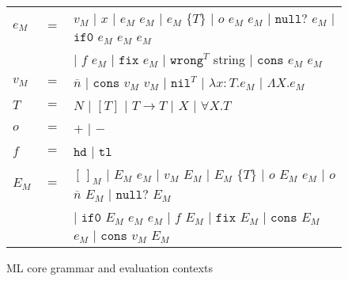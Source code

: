 \begin{figure}[p]
\centering
\begin{tabular}{lcl}
\vspace{5pt}

$e_{M}$ & $=$ & $v_{M}$ $\vert$ $x$ $\vert$ $e_{M}$ $e_{M}$ $\vert$ $e_{M}$ $\lbrace T\rbrace$ $\vert$ $o$ $e_{M}$ $e_{M}$ $\vert$ $\mathtt{null?}$ $e_{M}$ $\vert$ $\mathtt{if0}$ $e_{M}$ $e_{M}$ $e_{M}$ \\

\vspace{5pt}

&& $\vert$ $f$ $e_{M}$ $\vert$ $\mathtt{fix}$ $e_{M}$ $\vert$ $\mathtt{wrong}^{T}$ string $\vert$ $\mathtt{cons}$ $e_{M}$ $e_{M}$ \\

\vspace{5pt}

$v_{M}$ & $=$ & $\overline{n}$ $\vert$ $\mathtt{cons}$ $v_{M}$ $v_{M}$ $\vert$ $\mathtt{nil}^{T}$ $\vert$ $\lambda x:T.e_{M}$ $\vert$ $\Lambda X.e_{M}$ \\

\vspace{5pt}

$T$ & $=$ & $N$ $\vert$ $[T]$ $\vert$ $T\rightarrow T$ $\vert$ $X$ $\vert$ $\forall X.T$ \\

\vspace{5pt}

$o$ & $=$ & $+$ $\vert$ $-$ \\

\vspace{5pt}

$f$ & $=$ & $\mathtt{hd}$ $\vert$ $\mathtt{tl}$ \\

\vspace{5pt}

$E_{M}$ & $=$ & $[\,]_{M}$ $\vert$ $E_{M}$ $e_{M}$ $\vert$ $v_{M}$ $E_{M}$ $\vert$ $E_{M}$ $\lbrace T\rbrace$ $\vert$ $o$ $E_{M}$ $e_{M}$ $\vert$ $o$ $\overline{n}$ $E_{M}$ $\vert$ $\mathtt{null?}$ $E_{M}$ \\

\vspace{5pt}

&& $\vert$ $\mathtt{if0}$ $E_{M}$ $e_{M}$ $e_{M}$ $\vert$ $f$ $E_{M}$ $\vert$ $\mathtt{fix}$ $E_{M}$ $\vert$ $\mathtt{cons}$ $E_{M}$ $e_{M}$ $\vert$ $\mathtt{cons}$ $v_{M}$ $E_{M}$
\end{tabular}
\caption{ML core grammar and evaluation contexts}
\label{cmg}
\end{figure}